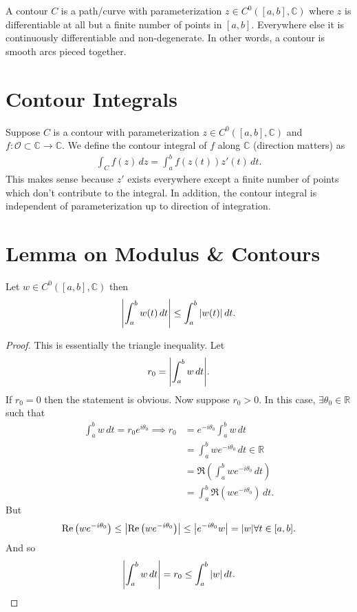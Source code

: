 \documentclass{article}
\theoremstyle{definition}
\newcommand{\R}{\mathbb{R}}
\newcommand{\C}{\mathbb{C}}
\newcommand{\lp}{\left(}
\newcommand{\rp}{\right)}
\newcommand{\nn}{\nonumber}
\begin{document}
A contour $C$ is a path/curve with parameterization $z \in C^0([a,b],\C)$ where $z$ is differentiable at all but a finite number of points in $[a,b]$. Everywhere else it is continuously differentiable and non-degenerate. In other words, a contour is smooth arcs pieced together.  


\section{Contour Integrals}



Suppose $C$ is a contour with parameterization $z \in C^0([a,b],\C)$ and $f: \mathcal{O}\subset\C \to \C$. We define the contour integral of $f$ along $\C$ (direction matters) as
\begin{align}
\int_C f(z)\,dz = \int^b_a f(z(t))z'(t)\,dt.
\end{align}
This makes sense because $z'$ exists everywhere except a finite number of points which don't contribute to the integral. In addition, the contour integral is independent of parameterization up to direction of integration. 



\section{Lemma on Modulus \& Contours}

Let $w \in C^0([a,b], \C)$ then 
\begin{align}
\abs{\int^b_aw(t)\,dt} \leq \int^b_a \abs{w(t)}\,dt.
\end{align}

\begin{proof}
	This is essentially the triangle inequality. Let
	\begin{align}
	r_0 = \abs{\int^b_a w\,dt}.
	\end{align}
	If $r_0 = 0$ then the statement is obvious. Now suppose $r_0 > 0$. In this case, $\exists \theta_0 \in \R$ such that 
	\begin{align}
	\int^b_a w\,dt = r_0 e^{i\theta_0} \implies r_0 &= e^{-i\theta_0}\int^b_a w\,dt\nn\\
	&= \int^b_a we^{-i\theta_0}\,dt \in\R\nn\\
	&= \Re\lp  \int^b_a we^{-i\theta_0}\,dt  \rp\nn\\
	&= \int^b_a \Re\lp we^{-i\theta_0} \rp\,dt.
	\end{align}
	But 
	\begin{align}
	\Re\lp we^{-i\theta_0} \rp \leq \abs{\Re\lp we^{-i\theta_0} \rp} \leq \abs{e^{-i\theta_0}w} = \abs{w} \forall t \in [a,b].
	\end{align}
	And so
	\begin{align}
	\abs{\int^b_a w\,dt} = r_0 \leq \int^b_a \abs{w}\,dt.
	\end{align}
\end{proof}
\end{document}
